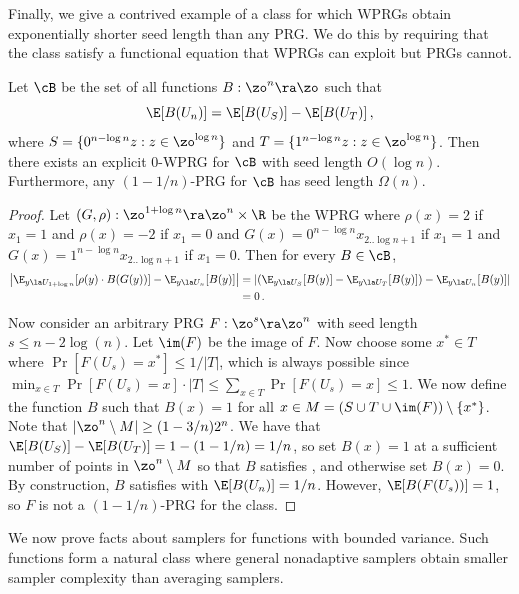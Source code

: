 Finally, we give a contrived example of a class for which WPRGs obtain exponentially shorter seed length than any PRG. We do this by requiring that the class satisfy a functional equation that WPRGs can exploit but PRGs cannot.
\begin{proposition}
Let $\cB$ be the set of all functions $B:\zo^n\ra\zo$ such that 
\begin{equation}\label{eqn:functional}
    \E[B(U_n)] = \E[B(U_S)]-\E[B(U_T)]\,,  %
\end{equation}
where $S=\{0^{n-\log n}z:z\in \zo^{\log n}\}$ and $T=\{1^{n-\log n}z:z\in \zo^{\log n}\}$. Then there exists an explicit 0-WPRG for $\cB$ with seed length $O(\log n)$. Furthermore, any $(1-1/n)$-PRG for $\cB$ has seed length $\Omega(n)$.
\end{proposition}
\begin{proof}
Let $(G,\rho):\zo^{1+\log n}\ra\zo^n\times \R$ be the WPRG where $\rho(x)=2$ if $x_1=1$ and $\rho(x)=-2$ if $x_1=0$ and $G(x)=0^{n-\log n}x_{2..\log n+1}$ if $x_1=1$ and $G(x)=1^{n-\log n}x_{2..\log n+1}$ if $x_1=0$. Then for every $B\in \cB$,
\begin{align*}
    \left|\E_{y\la U_{1+\log n}}[\rho(y)\cdot B(G(y))] - \E_{y\la U_n}[B(y)]\right| &= \left|\left(\E_{y\la U_{S}}[B(y)]-\E_{y\la U_T}[B(y)]\right) - \E_{y\la U_n}[B(y)]\right|\\
    &= 0\,.     %
\end{align*}
Now consider an arbitrary PRG $F:\zo^s\ra\zo^n$ with seed length $s\leq n-2\log(n)$. Let $\im(F)$ be the image of $F$. Now choose some $x^*\in T$ where $\Pr[F(U_s)=x^*]\leq 1/|T|$, which is always possible since $\min_{x\in T}\Pr[F(U_s)=x]\cdot |T|\leq \sum_{x\in T}\Pr[F(U_s)=x]\leq 1$. We now define the function $B$ such that $B(x)=1$ for all $x\in M=(S\cup T \cup \im(F))\setminus \{x^*\}$. Note that $|\zo^n\setminus M| \geq (1-3/n)2^n$. %
We have that $\E[B(U_S)]-\E[B(U_T)]=1-(1-1/n)=1/n$, so set $B(x)=1$ at a sufficient number of points in $\zo^n\setminus M$ so that $B$ satisfies , and otherwise set $B(x)=0$. By construction, $B$ satisfies  with $\E[B(U_n)]=1/n$. However, $\E[B(F(U_s))]=1$, so $F$ is not a $(1-1/n)$-PRG for the class.
\end{proof}

We now prove facts about samplers for functions with bounded variance. Such functions form a natural class where general nonadaptive samplers obtain smaller sampler complexity than averaging samplers.

